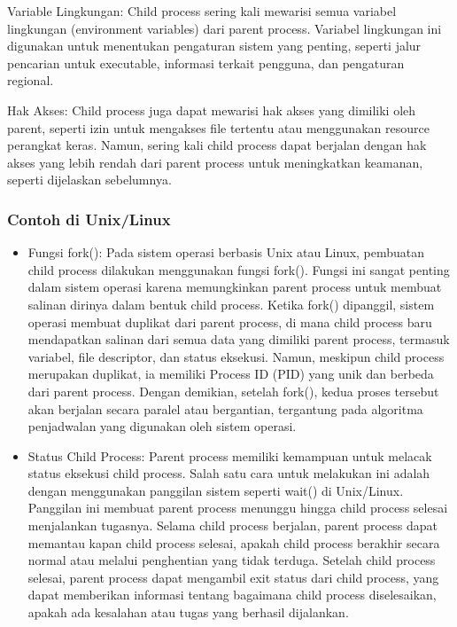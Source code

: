 \documentclass[12pt]{article}
\begin{document}
\begin{itemize}
    {Variable Lingkungan:} Child process sering kali mewarisi semua variabel lingkungan (environment variables) dari parent process. Variabel lingkungan ini digunakan untuk menentukan pengaturan sistem yang penting, seperti jalur pencarian untuk executable, informasi terkait pengguna, dan pengaturan regional.
   
    {Hak Akses:} Child process juga dapat mewarisi hak akses yang dimiliki oleh parent, seperti izin untuk mengakses file tertentu atau menggunakan resource perangkat keras. Namun, sering kali child process dapat berjalan dengan hak akses yang lebih rendah dari parent process untuk meningkatkan keamanan, seperti dijelaskan sebelumnya.
\end{itemize}

\subsubsection{Contoh di Unix/Linux}

\begin{itemize}
    \item Fungsi fork(): Pada sistem operasi berbasis Unix atau Linux, pembuatan child process dilakukan menggunakan fungsi fork(). Fungsi ini sangat penting dalam sistem operasi karena memungkinkan parent process untuk membuat salinan dirinya dalam bentuk child process. Ketika fork() dipanggil, sistem operasi membuat duplikat dari parent process, di mana child process baru mendapatkan salinan dari semua data yang dimiliki parent process, termasuk variabel, file descriptor, dan status eksekusi. Namun, meskipun child process merupakan duplikat, ia memiliki Process ID (PID) yang unik dan berbeda dari parent process. Dengan demikian, setelah fork(), kedua proses tersebut akan berjalan secara paralel atau bergantian, tergantung pada algoritma penjadwalan yang digunakan oleh sistem operasi.
    
    \item Status Child Process: Parent process memiliki kemampuan untuk melacak status eksekusi child process. Salah satu cara untuk melakukan ini adalah dengan menggunakan panggilan sistem seperti wait() di Unix/Linux. Panggilan ini membuat parent process menunggu hingga child process selesai menjalankan tugasnya. Selama child process berjalan, parent process dapat memantau kapan child process selesai, apakah child process berakhir secara normal atau melalui penghentian yang tidak terduga. Setelah child process selesai, parent process dapat mengambil exit status dari child process, yang dapat memberikan informasi tentang bagaimana child process diselesaikan, apakah ada kesalahan atau tugas yang berhasil dijalankan.
\end{itemize}
\end{document}
